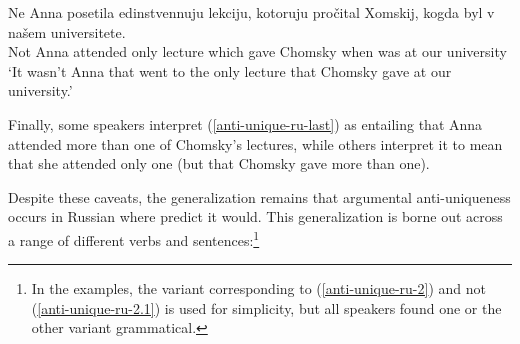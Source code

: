 \begin{exe}
	\ex \label{anti-unique-ru-2.1} \gll Ne Anna posetila edinstvennuju lekciju, kotoruju pro\v{c}ital Xomskij, kogda byl v na\v{s}em universitete.\\
	Not Anna attended only lecture which gave Chomsky when was at our university\\
	\glt `It wasn't Anna that went to the only lecture that Chomsky gave at our university.'
\end{exe}

Finally, some speakers interpret (\ref{anti-unique-ru-last}) as entailing that Anna attended more than one of Chomsky's lectures, while others interpret it to mean that she attended only one (but that Chomsky gave more than one).

Despite these caveats, the generalization remains that argumental anti-uniqueness occurs in Russian where \citeauthor{cb2015} predict it would. This generalization is borne out across a range of different verbs and sentences:\footnote{In the examples, the variant corresponding to (\ref{anti-unique-ru-2}) and not (\ref{anti-unique-ru-2.1}) is used for simplicity, but all speakers found one or the other variant grammatical.}

